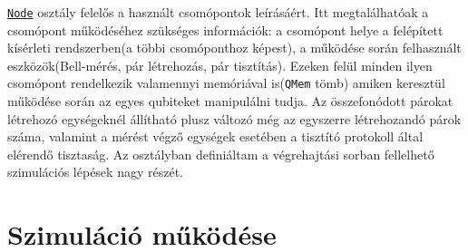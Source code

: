 \underline{\texttt{Node}} osztály felelős a használt csomópontok leírásáért. Itt megtalálhatóak a csomópont működéséhez szükséges információk:  a csomópont helye a felépített kísérleti rendszerben(a többi csomóponthoz képest), a működése során felhasznált eszközök(Bell-mérés, pár létrehozás, pár tisztítás). Ezeken felül minden ilyen csomópont rendelkezik valamennyi memóriával is(\texttt{QMem} tömb) amiken keresztül működése során az egyes qubiteket manipulálni tudja. Az összefonódott párokat létrehozó egységeknél állítható plusz változó még az egyszerre létrehozandó párok száma, valamint a mérést végző egységek esetében a tisztító protokoll által elérendő tisztaság. Az osztályban definiáltam a végrehajtási sorban fellelhető szimulációs lépések nagy részét.

\section{Szimuláció működése}

